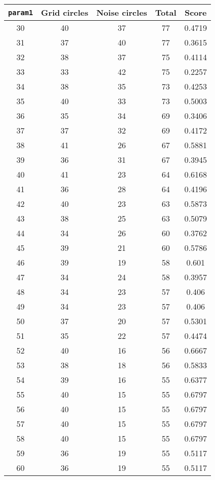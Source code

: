 \documentclass[letterpaper, 12pt]{article}
\begin{document}
\begin{longtable}{|c|c|c|c|c|}
\hline
\textbf{\texttt{param1}} & \textbf{Grid circles} & \textbf{Noise circles} & \textbf{Total} & \textbf{Score} \\
\hline
30 & 40 & 37 & 77 & 0.4719 \\
\hline
31 & 37 & 40 & 77 & 0.3615 \\
\hline
32 & 38 & 37 & 75 & 0.4114 \\
\hline
33 & 33 & 42 & 75 & 0.2257 \\
\hline
34 & 38 & 35 & 73 & 0.4253 \\
\hline
35 & 40 & 33 & 73 & 0.5003 \\
\hline
36 & 35 & 34 & 69 & 0.3406 \\
\hline
37 & 37 & 32 & 69 & 0.4172 \\
\hline
38 & 41 & 26 & 67 & 0.5881 \\
\hline
39 & 36 & 31 & 67 & 0.3945 \\
\hline
40 & 41 & 23 & 64 & 0.6168 \\
\hline
41 & 36 & 28 & 64 & 0.4196 \\
\hline
42 & 40 & 23 & 63 & 0.5873 \\
\hline
43 & 38 & 25 & 63 & 0.5079 \\
\hline
44 & 34 & 26 & 60 & 0.3762 \\
\hline
45 & 39 & 21 & 60 & 0.5786 \\
\hline
46 & 39 & 19 & 58 & 0.601 \\
\hline
47 & 34 & 24 & 58 & 0.3957 \\
\hline
48 & 34 & 23 & 57 & 0.406 \\
\hline
49 & 34 & 23 & 57 & 0.406 \\
\hline
50 & 37 & 20 & 57 & 0.5301 \\
\hline
51 & 35 & 22 & 57 & 0.4474 \\
\hline
52 & 40 & 16 & 56 & 0.6667 \\
\hline
53 & 38 & 18 & 56 & 0.5833 \\
\hline
54 & 39 & 16 & 55 & 0.6377 \\
\hline
55 & 40 & 15 & 55 & 0.6797 \\
\hline
56 & 40 & 15 & 55 & 0.6797 \\
\hline
57 & 40 & 15 & 55 & 0.6797 \\
\hline
58 & 40 & 15 & 55 & 0.6797 \\
\hline
59 & 36 & 19 & 55 & 0.5117 \\
\hline
60 & 36 & 19 & 55 & 0.5117 \\

\end{longtable}
\end{document}
